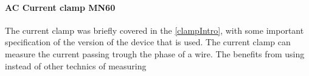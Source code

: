 \paragraph*{AC Current clamp MN60}
The current clamp was briefly covered in the \cref{clampIntro}, with some important specification of the version of the device that is used. The current clamp can measure the current passing trough the phase of a wire. The benefits from using instead of other technics of measuring 